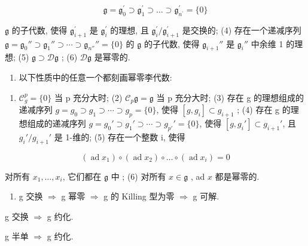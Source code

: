 \[
\mathfrak {g} = \mathfrak {g} _ {0} ^ {\prime} \supset \mathfrak {g} _ {1} ^ {\prime} \supset \dots \supset \mathfrak {g} _ {n ^ {\prime}} ^ {\prime} = \{0 \}
\]

\(\mathfrak{g}\) 的子代数, 使得 \(\mathfrak{g}_{i+1}^{\prime}\) 是 \(\mathfrak{g}_i^{\prime}\) 的理想, 且 \(\mathfrak{g}_i^{\prime}/\mathfrak{g}_{i+1}^{\prime}\) 是交换的; (4) 存在一个递减序列 \(\mathfrak{g} = \mathfrak{g}_0'' \supset \mathfrak{g}_1'' \supset \cdots \supset \mathfrak{g}_{n''}'' = \{0\}\) 的 \(\mathfrak{g}\) 的子代数, 使得 \(\mathfrak{g}_{i+1}''\) 是 \(\mathfrak{g}_i''\) 中余维 1 的理想; (5) \(\mathfrak{g} \supset \mathcal{D}\mathfrak{g}\) ; (6) \(\mathcal{D}\mathfrak{g}\) 是幂零的.

\begin{enumerate}
\def\labelenumi{(\Roman{enumi})}
\setcounter{enumi}{3}
\tightlist
\item
  以下性质中的任意一个都刻画幂零李代数:
\end{enumerate}

\begin{enumerate}
\def\labelenumi{(\arabic{enumi})}
\tightlist
\item
  \(\mathcal{C}_{g}^{p} = \{0\}\) 当 p 充分大时; (2) \(\mathcal{C}_{p}\mathfrak{g} = \mathfrak{g}\) 当 p 充分大时; (3) 存在 g 的理想组成的递减序列 \(g = g_{0} \supset g_{1} \supset \cdots \supset g_{p} = \{0\}\), 使得 \([g, g_{i}] \subset g_{i+1}\) ; (4) 存在 g 的理想组成的递减序列 \(g = g_{0}' \supset g_{1}' \supset \cdots \supset g_{p'}' = \{0\}\), 使得 \([g, g_{i}'] \subset g_{i+1}'\), 且 \(g_{i}'/g_{i+1}'\) 是 1-维的; (5) 存在一个整数 i, 使得
\end{enumerate}

\[
\left(\operatorname{ad} x _ {1}\right) \circ \left(\operatorname{ad} x _ {2}\right) \circ \dots \circ \left(\operatorname{ad} x _ {i}\right) = 0
\]

对所有 \(x_{1},\ldots ,x_{i}\), 它们都在 \(\mathfrak{g}\) 中 ; (6) 对所有 \(x\in \mathfrak{g}\) , ad \(x\) 都是幂零的.

\begin{enumerate}
\def\labelenumi{(\Alph{enumi})}
\setcounter{enumi}{21}
\tightlist
\item
  g 交换 \(\Rightarrow\) g 幂零 \(\Rightarrow\) g 的 Killing 型为零 \(\Rightarrow\) g 可解.
\end{enumerate}

g 交换 \(\Rightarrow\) g 约化.

g 半单 \(\Rightarrow\) g 约化.

